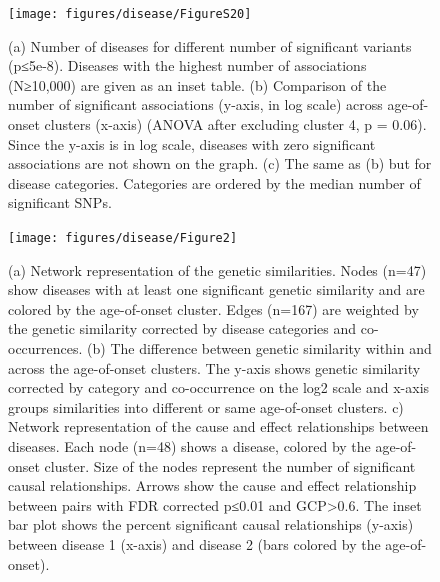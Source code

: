 \documentclass[12pt,twoside]{unicam}
\begin{document}
\begin{figure}

{\centering \texttt{[image: figures/disease/FigureS20]} 

}

\caption[Distribution of significant disease associations across diseases, age-of-onset clusters, and disease categories.]{(a) Number of diseases for different number of significant variants (p≤5e-8). Diseases with the highest number of associations (N≥10,000) are given as an inset table. (b) Comparison of the number of significant associations (y-axis, in log scale) across age-of-onset clusters (x-axis) (ANOVA after excluding cluster 4, p = 0.06). Since the y-axis is in log scale, diseases with zero significant associations are not shown on the graph. (c) The same as (b) but for disease categories. Categories are ordered by the median number of significant SNPs.}\label{fig:disFigS20}
\end{figure}

\begin{figure}

{\centering \texttt{[image: figures/disease/Figure2]} 

}

\caption[Genetic similarities and cause-effect relationships between diseases.]{(a) Network representation of the genetic similarities. Nodes (n=47) show diseases with at least one significant genetic similarity and are colored by the age-of-onset cluster. Edges (n=167) are weighted by the genetic similarity corrected by disease categories and co-occurrences. (b) The difference between genetic similarity within and across the age-of-onset clusters. The y-axis shows genetic similarity corrected by category and co-occurrence on the log2 scale and x-axis groups similarities into different or same age-of-onset clusters. c) Network representation of the cause and effect relationships between diseases. Each node (n=48) shows a disease, colored by the age-of-onset cluster. Size of the nodes represent the number of significant causal relationships. Arrows show the cause and effect relationship between pairs with FDR corrected p≤0.01 and GCP>0.6. The inset bar plot shows the percent significant causal relationships (y-axis) between disease 1 (x-axis) and disease 2 (bars colored by the age-of-onset).}\label{fig:disFig2}
\end{figure}
\end{document}
